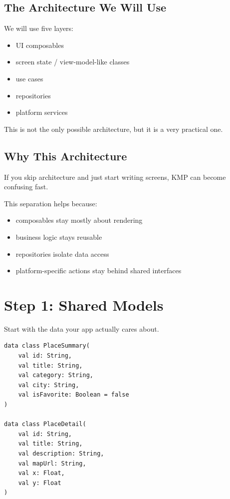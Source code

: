 \documentclass[11pt,a4paper]{article}
\begin{document}
\subsection{The Architecture We Will Use}

We will use five layers:
\begin{itemize}
    \item UI composables
    \item screen state / view-model-like classes
    \item use cases
    \item repositories
    \item platform services
\end{itemize}

This is not the only possible architecture, but it is a very practical one.

\subsection{Why This Architecture}

If you skip architecture and just start writing screens, KMP can become confusing fast.

This separation helps because:
\begin{itemize}
    \item composables stay mostly about rendering
    \item business logic stays reusable
    \item repositories isolate data access
    \item platform-specific actions stay behind shared interfaces
\end{itemize}

\section{Step 1: Shared Models}

Start with the data your app actually cares about.

\begin{lstlisting}[style=kazekotlin]
data class PlaceSummary(
    val id: String,
    val title: String,
    val category: String,
    val city: String,
    val isFavorite: Boolean = false
)

data class PlaceDetail(
    val id: String,
    val title: String,
    val description: String,
    val mapUrl: String,
    val x: Float,
    val y: Float
)
\end{lstlisting}
\end{document}
